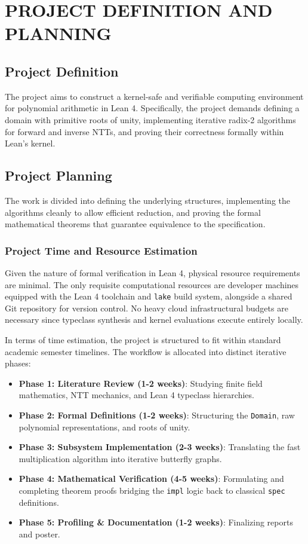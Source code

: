 \documentclass[a4paper,12pt]{report}
\begin{document}
\chapter{PROJECT DEFINITION AND PLANNING}
\section{Project Definition}
The project aims to construct a kernel-safe and verifiable computing environment for polynomial arithmetic in Lean 4. Specifically, the project demands defining a domain with primitive roots of unity, implementing iterative radix-2 algorithms for forward and inverse NTTs, and proving their correctness formally within Lean's kernel.

\section{Project Planning}
The work is divided into defining the underlying structures, implementing the algorithms cleanly to allow efficient reduction, and proving the formal mathematical theorems that guarantee equivalence to the specification.

\subsection{Project Time and Resource Estimation}
Given the nature of formal verification in Lean 4, physical resource requirements are minimal. The only requisite computational resources are developer machines equipped with the Lean 4 toolchain and \texttt{lake} build system, alongside a shared Git repository for version control. No heavy cloud infrastructural budgets are necessary since typeclass synthesis and kernel evaluations execute entirely locally.

In terms of time estimation, the project is structured to fit within standard academic semester timelines. The workflow is allocated into distinct iterative phases:
\begin{itemize}
    \item \textbf{Phase 1: Literature Review (1-2 weeks)}: Studying finite field mathematics, NTT mechanics, and Lean 4 typeclass hierarchies.
    \item \textbf{Phase 2: Formal Definitions (1-2 weeks)}: Structuring the \texttt{Domain}, raw polynomial representations, and roots of unity.
    \item \textbf{Phase 3: Subsystem Implementation (2-3 weeks)}: Translating the fast multiplication algorithm into iterative butterfly graphs.
    \item \textbf{Phase 4: Mathematical Verification (4-5 weeks)}: Formulating and completing theorem proofs bridging the \texttt{impl} logic back to classical \texttt{spec} definitions.
    \item \textbf{Phase 5: Profiling \& Documentation (1-2 weeks)}: Finalizing reports and poster.
\end{itemize}
\end{document}
